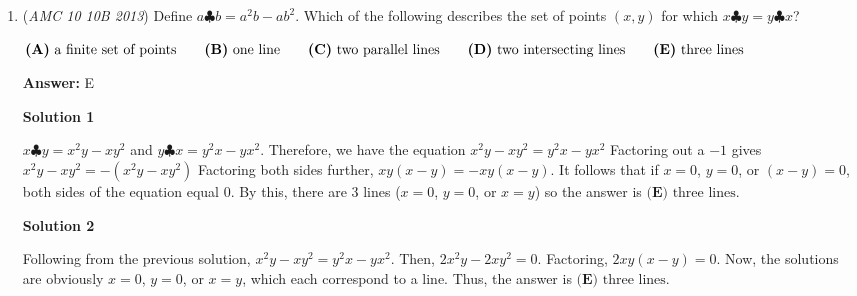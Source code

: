 \begin{enumerate}
Consider the quadratic $(1,1), (2,2), (3,4), (4,7), \dots$. Then the finite difference is 1, hence $2a =1$ and thus $a = \frac{1}{2}$. Rewrite the quadratic of the form $\frac{1}{2} x^2 + bx+c$. Then, plugging in 1,2, we have $\frac{1}{2} + b+c = 1$ and $2 + 2b + c = 2$, hence $b+c = \frac{1}{2}$ and $2b+c = 0$, hence $b-2b = \frac{1}{2}$ and thus $b = \frac{-1}{2}$. The quadratic is then $\frac{x(x-1)}{2} + 1$.

 Indeed, this quadratic grants the next time "1" is said by either player. Hence, at $x = 7$, it is said at position 22. We can use this to easily solve the problem, as in $x=10$, it is said as the 46-th position. At $x=11$, it is said at the 56-th position, hence this "chunk" ranges from $1-10$, and the 53rd number is $10_{(55 - 2)} = \boxed{8}_{(53)}$.

 


	\item (\textit{AMC 10 10B 2013}) Define $a\clubsuit b=a^2b-ab^2$. Which of the following describes the set of points $(x, y)$ for which $x\clubsuit y=y\clubsuit x$?


 $\textbf{(A)}\ \text{a finite set of points}\\ \qquad\textbf{(B)}\ \text{one line}\\ \qquad\textbf{(C)}\ \text{two parallel lines}\\ \qquad\textbf{(D)}\ \text{two intersecting lines}\\ \qquad\textbf{(E)}\ \text{three lines}$

 \textbf{Answer: }E



\textbf{Solution 1}

$x\clubsuit y = x^2y-xy^2$ and $y\clubsuit x = y^2x-yx^2$. Therefore, we have the equation $x^2y-xy^2 = y^2x-yx^2$ Factoring out a $-1$ gives $x^2y-xy^2 = -(x^2y-xy^2)$ Factoring both sides further, $xy(x-y) = -xy(x-y)$. It follows that if $x=0$, $y=0$, or $(x-y)=0$, both sides of the equation equal 0. By this, there are 3 lines ($x=0$, $y=0$, or $x=y$) so the answer is $\boxed{\textbf{(E)}\text{ three lines}}$.

 



\textbf{Solution 2}

Following from the previous solution, $x^2y-xy^2 = y^2x-yx^2$. Then, $2x^2y-2xy^2=0$. Factoring, $2xy(x-y)=0$. Now, the solutions are obviously $x=0$, $y=0$, or $x=y$, which each correspond to a line. Thus, the answer is $\boxed{\textbf{(E)}\text{ three lines}}$.


\end{enumerate}
